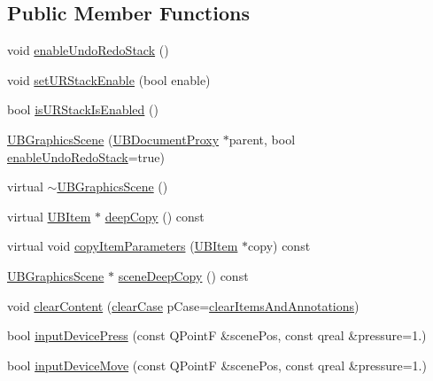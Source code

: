 \subsection*{Public Member Functions}
\begin{DoxyCompactItemize}
\item 
void \hyperlink{class_u_b_graphics_scene_a7ccefa0b71c3b0ae6634eed91a5444b7}{enable\-Undo\-Redo\-Stack} ()
\item 
void \hyperlink{class_u_b_graphics_scene_a464b1abf70e29b2a606415e85a53fa28}{set\-U\-R\-Stack\-Enable} (bool enable)
\item 
bool \hyperlink{class_u_b_graphics_scene_a3a19626bcbff3475ed3c0f0b5fb58036}{is\-U\-R\-Stack\-Is\-Enabled} ()
\item 
\hyperlink{class_u_b_graphics_scene_a759a1e2470ba43f042d0c56c4cf70539}{U\-B\-Graphics\-Scene} (\hyperlink{class_u_b_document_proxy}{U\-B\-Document\-Proxy} $\ast$parent, bool \hyperlink{class_u_b_graphics_scene_a7ccefa0b71c3b0ae6634eed91a5444b7}{enable\-Undo\-Redo\-Stack}=true)
\item 
virtual \hyperlink{class_u_b_graphics_scene_a45555106bf190853ab97190ef910b72e}{$\sim$\-U\-B\-Graphics\-Scene} ()
\item 
virtual \hyperlink{class_u_b_item}{U\-B\-Item} $\ast$ \hyperlink{class_u_b_graphics_scene_a27b80506198fc72a3039c90ebef7a0d3}{deep\-Copy} () const 
\item 
virtual void \hyperlink{class_u_b_graphics_scene_a6b3b2507342f09b1169b7b1ef1427118}{copy\-Item\-Parameters} (\hyperlink{class_u_b_item}{U\-B\-Item} $\ast$copy) const 
\item 
\hyperlink{class_u_b_graphics_scene}{U\-B\-Graphics\-Scene} $\ast$ \hyperlink{class_u_b_graphics_scene_a5d793edf48a0905e7dc1725b3f6da449}{scene\-Deep\-Copy} () const 
\item 
void \hyperlink{class_u_b_graphics_scene_a6e861912547654e47c26f7d8e72201e8}{clear\-Content} (\hyperlink{class_u_b_graphics_scene_a35c5d1a0571964d92e864db92e29d5bd}{clear\-Case} p\-Case=\hyperlink{class_u_b_graphics_scene_a35c5d1a0571964d92e864db92e29d5bdaa6eb8805c739ae37c1ccc642e349d64a}{clear\-Items\-And\-Annotations})
\item 
bool \hyperlink{class_u_b_graphics_scene_aa7b9011c76710841c644801d235ae3f2}{input\-Device\-Press} (const Q\-Point\-F \&scene\-Pos, const qreal \&pressure=1.)
\item 
bool \hyperlink{class_u_b_graphics_scene_a9354a46739a316286901ebd12b2bcf1b}{input\-Device\-Move} (const Q\-Point\-F \&scene\-Pos, const qreal \&pressure=1.)

\end{DoxyCompactItemize}
